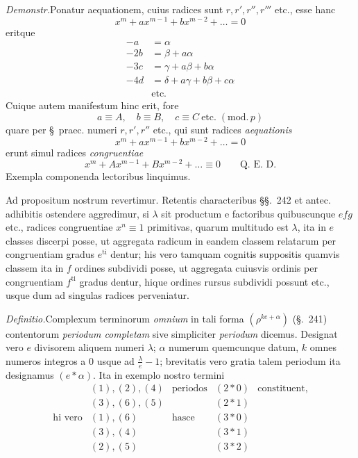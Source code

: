 \emph{Demonstr.}\quad Ponatur aequationem, cuius radices sunt $r,r',r'',r'''$ etc., esse hanc
\[
x^m+ax^{m-1}+bx^{m-2}+\ldots=0
\]
eritque
\[
\begin{aligned}
-a&=\alpha\\
-2b&=\beta+a\alpha\\
-3c&=\gamma+a\beta+b\alpha\\
-4d&=\delta+a\gamma+b\beta+c\alpha\\
&\text{etc.}
\end{aligned}
\]
Cuique autem manifestum hinc erit, fore
\[
a\equiv A,\quad b\equiv B,\quad c\equiv C\ \text{etc.}\;(\mathrm{mod.}\,p)
\]
quare per \S\ praec. numeri $r,r',r''$ etc., qui sunt radices \emph{aequationis}
\[
x^m+ax^{m-1}+bx^{m-2}+\ldots=0
\]
erunt simul radices \emph{congruentiae}
\[
x^m+Ax^{m-1}+Bx^{m-2}+\ldots\equiv0\qquad\text{Q. E. D.}
\]
Exempla componenda lectoribus linquimus.

Ad propositum nostrum revertimur. Retentis characteribus \S\S.\ 242 et antec. adhibitis ostendere aggredimur, si $\lambda$ sit productum e factoribus quibuscunque
%
$efg$ etc., radices congruentiae $x^n\equiv1$ primitivas, quarum multitudo est $\lambda$, ita in $e$ classes discerpi posse, ut aggregata radicum in eandem classem relatarum per congruentiam gradus $e^{\mathrm{ti}}$ dentur; his vero tamquam cognitis suppositis quamvis classem ita in $f$ ordines subdividi posse, ut aggregata cuiusvis ordinis per congruentiam $f^{\mathrm{ti}}$ gradus dentur, hique ordines rursus subdividi possunt etc., usque dum ad singulas radices perveniatur.

\emph{Definitio.}\quad Complexum terminorum \emph{omnium} in tali forma $(\rho^{ke+\alpha})$ (\S.\ 241) contentorum \emph{periodum completam} sive simpliciter \emph{periodum} dicemus. Designat vero $e$ divisorem aliquem numeri $\lambda$; $\alpha$ numerum quemcunque datum, $k$ omnes numeros integros a $0$ usque ad $\frac{\lambda}{e}-1$; brevitatis vero gratia talem periodum ita designamus $(e\ast\alpha)$. Ita in exemplo nostro termini
\[
\begin{array}{rclcl}
&(1),(2),(4)&\text{periodos}&(2\ast0)&\text{constituent,}\\
&(3),(6),(5)&&(2\ast1)&\\
\text{hi vero}&(1),(6)&\text{hasce}&(3\ast0)&\\
&(3),(4)&&(3\ast1)&\\
&(2),(5)&&(3\ast2)&
\end{array}
\]

